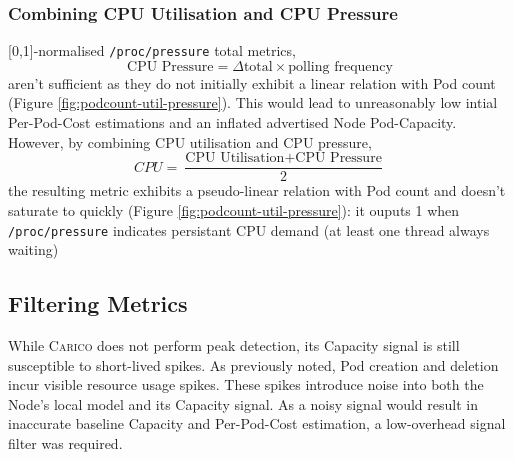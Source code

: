 \subsubsection{Combining CPU Utilisation and CPU Pressure}
[0,1]-normalised \verb|/proc/pressure| total metrics,
\[ \text{CPU Pressure} = \Delta \text{total} \times \text{polling frequency} \]
aren't sufficient as they do not initially exhibit a linear relation with Pod
count (Figure \ref{fig:podcount-util-pressure}). This would lead to
unreasonably low intial Per-Pod-Cost estimations and an inflated advertised Node
Pod-Capacity. However, by combining CPU utilisation and CPU pressure,
\[ CPU = \frac{\text{CPU Utilisation} + \text{CPU Pressure}}{2} \]
the resulting metric exhibits a pseudo-linear relation with Pod count and
doesn't saturate to quickly (Figure \ref{fig:podcount-util-pressure}): it ouputs
1 when \verb|/proc/pressure| indicates persistant CPU demand (at least one
thread always waiting)

\subsection{Filtering Metrics}
While \textsc{Carico} does not perform peak detection, its Capacity signal is
still susceptible to short-lived spikes. As previously noted,  Pod creation and
deletion incur visible resource usage spikes. These spikes introduce noise into
both the Node's local model and its Capacity signal. As a noisy signal
would result in inaccurate baseline Capacity and Per-Pod-Cost estimation, a
low-overhead signal filter was required.

